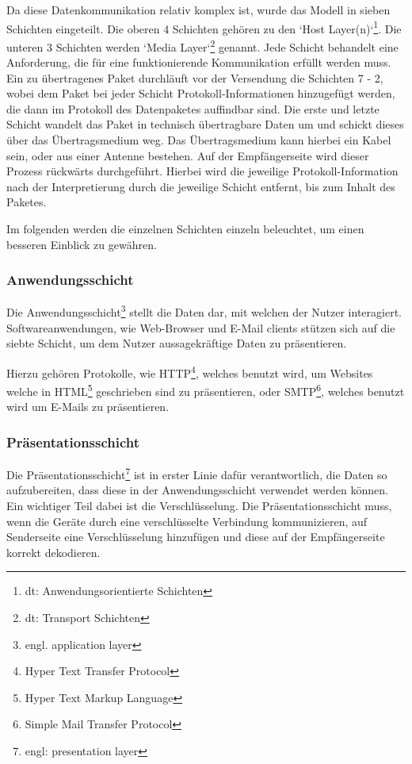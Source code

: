 \documentclass[12pt]{article}
\begin{document}
	Da diese  Datenkommunikation relativ komplex ist, wurde das Modell in sieben Schichten eingeteilt. Die oberen 4 Schichten gehören zu den `Host Layer(n)`\footnote{dt: Anwendungsorientierte Schichten}. Die unteren 3 Schichten werden `Media Layer`\footnote{dt: Transport Schichten} genannt. Jede Schicht behandelt eine Anforderung, die für eine funktionierende Kommunikation erfüllt werden muss. Ein zu übertragenes Paket durchläuft vor der Versendung die Schichten 7 - 2, wobei dem Paket bei jeder Schicht Protokoll-Informationen hinzugefügt werden, die dann im Protokoll des Datenpaketes auffindbar sind. Die erste und letzte Schicht wandelt das Paket in technisch übertragbare Daten um und schickt dieses über das Übertragsmedium weg. Das Übertragsmedium kann hierbei ein Kabel sein, oder aus einer Antenne bestehen. Auf der Empfängerseite wird dieser Prozess rückwärts durchgeführt. Hierbei wird die jeweilige Protokoll-Information nach der Interpretierung durch die jeweilige Schicht entfernt, bis zum Inhalt des Paketes.
	
	Im folgenden werden die einzelnen Schichten  einzeln beleuchtet, um einen besseren Einblick zu gewähren.


\subsubsection{Anwendungsschicht}
	Die Anwendungsschicht\footnote{engl. application layer} stellt die Daten dar, mit welchen der Nutzer interagiert. Softwareanwendungen, wie Web-Browser und E-Mail clients stützen sich auf die siebte Schicht, um dem Nutzer aussagekräftige Daten zu präsentieren. 
	
	Hierzu gehören Protokolle, wie HTTP\footnote{Hyper Text Transfer Protocol}, welches benutzt wird, um Websites welche in HTML\footnote{Hyper Text Markup Language} geschrieben sind zu präsentieren, oder SMTP\footnote{Simple Mail Transfer Protocol}, welches benutzt wird um E-Mails zu präsentieren.

\subsubsection{Präsentationsschicht}
	Die Präsentationsschicht\footnote{engl: presentation layer} ist in erster Linie dafür verantwortlich, die Daten so aufzubereiten, dass diese in der Anwendungsschicht verwendet werden können. Ein wichtiger Teil dabei ist die Verschlüsselung. Die Präsentationsschicht muss, wenn die Geräte durch eine verschlüsselte Verbindung kommunizieren, auf Senderseite eine Verschlüsselung hinzufügen und diese auf der Empfängerseite korrekt dekodieren. 
	
\end{document}

